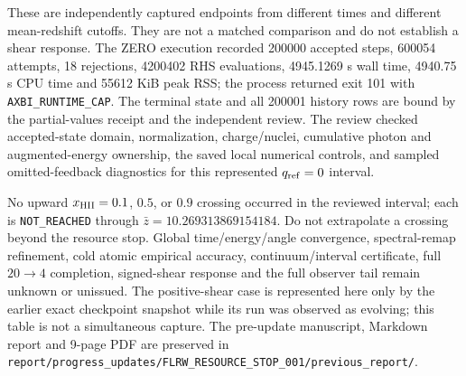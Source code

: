 \documentclass[11pt]{article}
\begin{document}
\begin{center}
\end{center}

These are independently captured endpoints from different times and different mean-redshift cutoffs. They are not a matched comparison and do not establish a shear response. The ZERO execution recorded 200000 accepted steps, 600054 attempts, 18 rejections, 4200402 RHS evaluations, 4945.1269 s wall time, 4940.75 s CPU time and 55612 KiB peak RSS; the process returned exit 101 with \texttt{AXBI\_RUNTIME\_CAP}. The terminal state and all 200001 history rows are bound by the partial-values receipt and the independent review. The review checked accepted-state domain, normalization, charge/nuclei, cumulative photon and augmented-energy ownership, the saved local numerical controls, and sampled omitted-feedback diagnostics for this represented $q_{\rm ref}=0$ interval.

No upward $x_{\rm HII}=0.1$, $0.5$, or $0.9$ crossing occurred in the reviewed interval; each is \texttt{NOT\_REACHED} through $\bar z=10.269313869154184$. Do not extrapolate a crossing beyond the resource stop. Global time/energy/angle convergence, spectral-remap refinement, cold atomic empirical accuracy, continuum/interval certificate, full $20\to4$ completion, signed-shear response and the full observer tail remain unknown or unissued. The positive-shear case is represented here only by the earlier exact checkpoint snapshot while its run was observed as evolving; this table is not a simultaneous capture. The pre-update manuscript, Markdown report and 9-page PDF are preserved in \texttt{report/progress\_updates/FLRW\_RESOURCE\_STOP\_001/previous\_report/}.
\end{document}
